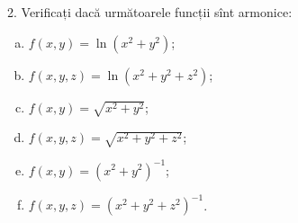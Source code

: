 
\vspace{1cm}

2. Verificați dacă următoarele funcții sînt armonice:
\begin{enumerate}[(a)]
\item $ f(x, y) = \ln(x^2 + y^2) $;
\item $ f(x, y, z) = \ln(x^2 + y^2 + z^2) $;
\item $ f(x, y) = \sqrt{x^2 + y^2} $;
\item $ f(x, y, z) = \sqrt{x^2 + y^2 + z^2} $;
\item $ f(x, y) = (x^2 + y^2)^{-1} $;
\item $ f(x, y, z) = (x^2 + y^2 + z^2)^{-1} $.
\end{enumerate}




